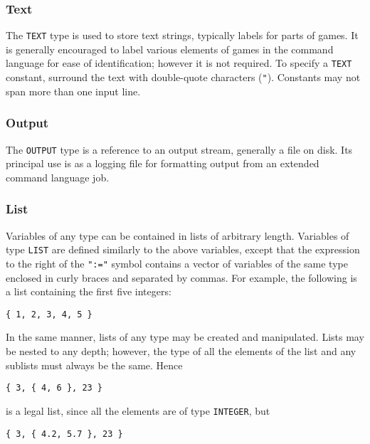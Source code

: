 \subsubsection{Text}

The {\tt TEXT} type is used to store text strings, typically labels
for parts of games.  It is generally encouraged to label various elements
of games in the command language for ease of identification; however it
is not required.  To specify a {\tt TEXT} constant, surround the
text with double-quote characters ({\tt "}).  Constants may not span
more than one input line.

\subsubsection{Output}

The {\tt OUTPUT} type is a reference to an output stream, generally a file
on disk.  Its principal use is as a logging file for formatting output
from an extended command language job.

\subsubsection{List}

Variables of any type can be contained in lists of arbitrary length.
Variables of type {\tt LIST} are defined similarly to the above
variables, except that the expression to the right of the {\tt ":="}
symbol contains a vector of variables of the same type enclosed in
curly braces and separated by commas.  For example, the following is a
list containing the first five integers:

\begin{verbatim}
{ 1, 2, 3, 4, 5 }
\end{verbatim}

\noindent In the same manner, lists of any type may be created and manipulated.
Lists may be nested to any depth; however, the type of all the elements
of the list and any sublists must always be the same.  Hence

\begin{verbatim}
{ 3, { 4, 6 }, 23 }
\end{verbatim}

\noindent is a legal list, since all the elements are of type 
{\tt INTEGER}, but

\begin{verbatim}
{ 3, { 4.2, 5.7 }, 23 }
\end{verbatim}

